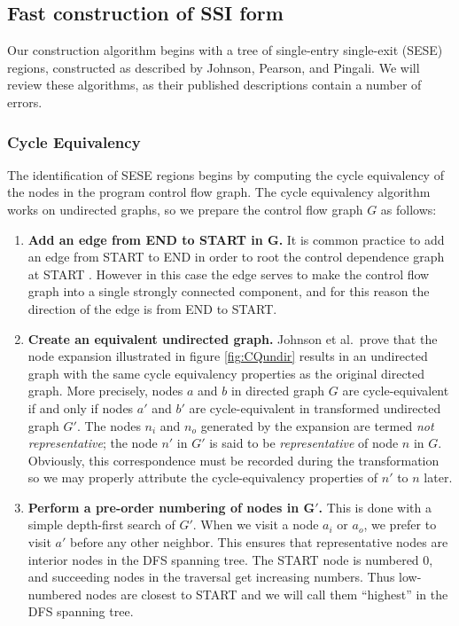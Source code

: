 \documentclass[12pt,notitlepage]{article}
\begin{document}
\subsection{Fast construction of SSI form}
Our construction algorithm begins with a tree of single-entry
single-exit (SESE) regions, constructed as described by Johnson,
Pearson, and Pingali.  We will review these algorithms, as their
published descriptions \cite{johnson93:sese} contain a number of
errors.

\subsubsection{Cycle Equivalency}
The identification of SESE regions begins by computing the cycle
equivalency of the nodes in the program control flow graph.  The cycle
equivalency algorithm works on undirected graphs, so we prepare the
control flow graph $G$ as follows:
\begin{enumerate}
\item \textbf{Add an edge from END to START in $\mathbf{G}$.} It is common
practice to add an edge from START to END in order to root the control
dependence graph at START \cite{cytron89:ssa}.  However in this case
the edge serves to make the control flow graph into a single strongly
connected component, and for this reason the direction of the edge is
from END to START.
\item \textbf{Create an equivalent undirected graph.}  Johnson et al.\
prove that the node expansion illustrated in figure \ref{fig:CQundir}
results in an undirected graph with the same cycle equivalency
properties as the original directed graph.  More precisely, nodes $a$
and $b$ in directed graph $G$ are cycle-equivalent if and only if
nodes $a'$ and $b'$ are cycle-equivalent in transformed undirected
graph $G'$.  The nodes $n_i$ and $n_o$ generated by the expansion are
termed \emph{not representative}; the node $n'$ in $G'$ is said to be
\emph{representative} of node $n$ in $G$.  Obviously, this
correspondence must be recorded during the transformation so we may
properly attribute the cycle-equivalency properties of $n'$ to $n$
later.
\item \textbf{Perform a pre-order numbering of nodes in $\mathbf{G'}$.}
This is done with a simple depth-first search of $G'$.  When we visit
a node $a_i$ or $a_o$, we prefer to visit $a'$ before any other
neighbor.  This ensures that representative nodes are interior nodes
in the DFS spanning tree. The START node is numbered 0, and succeeding
nodes in the traversal get increasing numbers.  Thus low-numbered
nodes are closest to START and we will call them ``highest'' in the
DFS spanning tree.
\end{enumerate}
\end{document}
